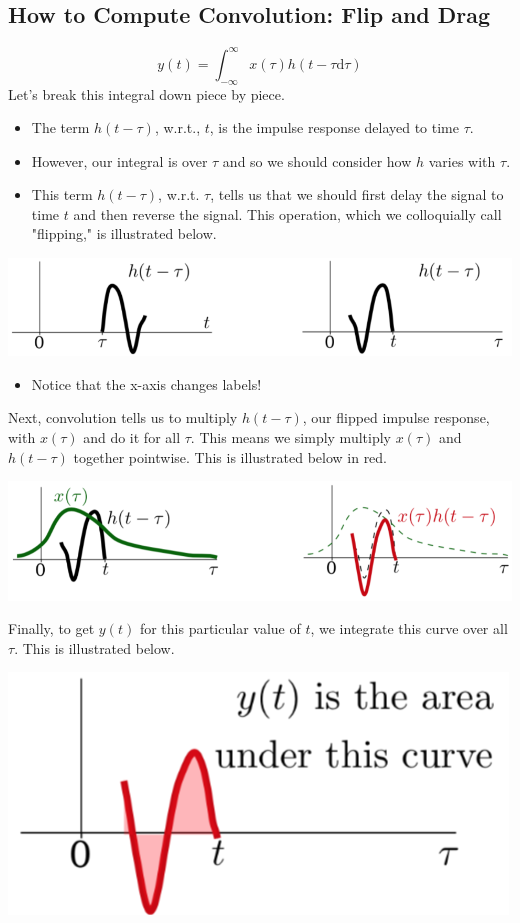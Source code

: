 \documentclass[10pt]{article}
\begin{document}
\subsection*{How to Compute Convolution: Flip and Drag}
\[y(t) = \int_{-\infty}^\infty x(\tau) h(t - \tau \text{d}\tau)\]
Let's break this integral down piece by piece.
\begin{itemize}
    \item The term $h(t - \tau)$, w.r.t., $t$, is the impulse response delayed to time $\tau$.
    \item However, our integral is over $\tau$ and so we should consider how $h$ varies with $\tau$.
    \item This term $h(t - \tau)$, w.r.t. $\tau$, tells us that we should first delay the signal to time $t$ and then reverse the signal.  This operation, which we colloquially call "flipping," is illustrated below.
\end{itemize}
\begin{center}
    \includegraphics[scale=0.8]{W3_4.png}
\end{center}
\begin{itemize}
    \item Notice that the x-axis changes labels!
\end{itemize}
Next, convolution tells us to multiply $h(t - \tau)$, our flipped impulse response, with $x(\tau)$ and do it for all $\tau$.  This means we simply multiply $x(\tau)$ and $h(t - \tau)$ together pointwise.  This is illustrated below in red.
\begin{center}
    \includegraphics[scale=0.8]{W3_5.png}
\end{center}
Finally, to get $y(t)$ for this particular value of $t$, we integrate this curve over all $\tau$.  This is illustrated below.
\begin{center}
    \includegraphics[scale=0.9]{W3_6.png}
\end{center}
\end{document}
